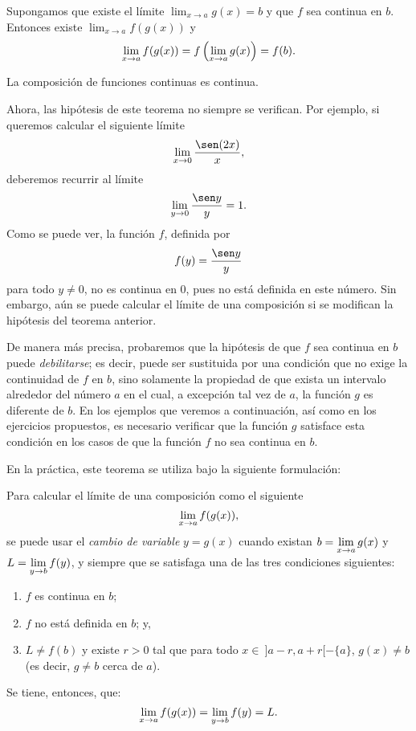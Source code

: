 \begin{teocal}
Supongamos que existe el límite $\displaystyle\lim_{x\to a}g(x)= b$ y que $f$ sea continua en $b$. Entonces
existe $\displaystyle\lim_{x\to a}f(g(x))$ y
\[
\lim_{x\to a}f(g(x)) = f\left(\limjc{g(x)}{x}{a}\right) = f(b).
\]
\end{teocal}%

\begin{corocal}[]
La composición de funciones continuas es continua.
\end{corocal}


Ahora, las hipótesis de este teorema no siempre se verifican. Por ejemplo, si queremos calcular
el siguiente límite
\[
\limjc{\frac{\sen(2x)}{x}}{x}{0},
\]
deberemos recurrir al límite
\[
\limjc{\frac{\sen y}{y}}{y}{0} = 1.
\]
Como se puede ver, la función $f$, definida por
\[
f(y) = \frac{\sen y}{y}
\]
para todo $y\neq 0$, no es continua en $0$, pues no está definida en este número. Sin embargo, aún
se puede calcular el límite de una composición si se modifican la hipótesis del teorema anterior.

De manera más precisa, probaremos que la hipótesis de que $f$ sea continua en $b$ puede
\emph{debilitarse}; es decir, puede ser sustituida por una condición que no exige la continuidad de
$f$ en $b$, sino solamente la propiedad de que exista un intervalo alrededor del número $a$ en el
cual, a excepción tal vez de $a$, la función $g$ es diferente de $b$. En los ejemplos que veremos a
continuación, así como en los ejercicios propuestos, es necesario verificar que la función $g$
satisface esta condición en los casos de que la función $f$ no sea continua en $b$.

En la práctica, este teorema se utiliza bajo la siguiente formulación:

\begin{teocal}\label{teo:LimCambioVariable}%
Para calcular el límite de una composición como el siguiente
\[
\limjc{f(g(x))}{x}{a},
\]
se puede usar el \emph{cambio de variable}
$
y = g(x)
$
cuando existan $\displaystyle b = \limjc{g(x)}{x}{a}$ y $\displaystyle L = \limjc{f(y)}{y}{b}$, y siempre que se satisfaga una de las tres condiciones siguientes:
\begin{enumerate}
\item $f$ es continua en $b$;
\item $f$ no está definida en $b$; y,
\item $L \neq f(b)$ y existe $r > 0$ tal que para todo $x \in\ ]a-r,a+r[-\{a\}$, $g(x) \neq b$ (es decir, $g\neq b$ cerca de $a$).
\end{enumerate}
Se tiene, entonces, que:
\[
\limjc{f(g(x))}{x}{a} = \limjc{f(y)}{y}{b} = L.
\]
\end{teocal}

